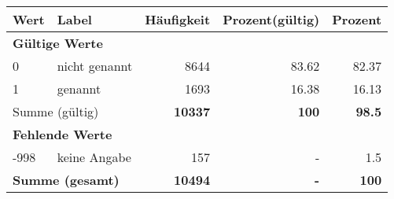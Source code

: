      \begin{longtable}{lXrrr}
     \toprule
     \textbf{Wert} & \textbf{Label} & \textbf{Häufigkeit} & \textbf{Prozent(gültig)} & \textbf{Prozent} \\
     \endhead
     \midrule
     \multicolumn{5}{l}{\textbf{Gültige Werte}}\\

     0 &
     \multicolumn{1}{X}{ nicht genannt   } &


       \num{8644} &
       \num[round-mode=places,round-precision=2]{83.62} &
         \num[round-mode=places,round-precision=2]{82.37} \\

     1 &
     \multicolumn{1}{X}{ genannt   } &


       \num{1693} &
       \num[round-mode=places,round-precision=2]{16.38} &
         \num[round-mode=places,round-precision=2]{16.13} \\
     \midrule
     \multicolumn{2}{l}{Summe (gültig)} &
       \textbf{\num{10337}} &
     \textbf{\num{100}} &
       \textbf{\num[round-mode=places,round-precision=2]{98.5}} \\
     \multicolumn{5}{l}{\textbf{Fehlende Werte}}\\
       -998 &
       keine Angabe &
         \num{157} &
        - &
         \num[round-mode=places,round-precision=2]{1.5} \\
     \midrule
     \multicolumn{2}{l}{\textbf{Summe (gesamt)}} &
          \textbf{\num{10494}} &
        \textbf{-} &
        \textbf{\num{100}} \\
     \bottomrule
     \end{longtable}
     
